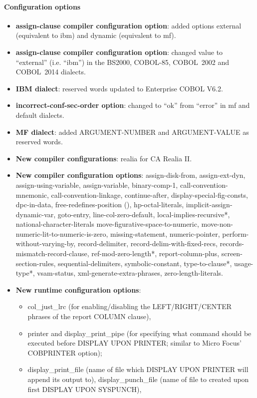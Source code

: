 \paragraph{Configuration options}
\begin{itemize}
\item \textbf{assign-clause compiler configuration option}: added options external (equivalent to ibm) and dynamic (equivalent to mf).
\item \textbf{assign-clause compiler configuration option}: changed value to ``external'' (i.e. ``ibm'') in the BS2000, COBOL-85, COBOL~2002 and COBOL~2014 dialects.
\item \textbf{IBM dialect}: reserved words updated to Enterprise COBOL V6.2.
\item \textbf{incorrect-conf-sec-order option}: changed to ``ok'' from ``error'' in mf and default dialects.
\item \textbf{MF dialect}: added ARGUMENT-NUMBER and ARGUMENT-VALUE as reserved words.
\item \textbf{New compiler configurations}: realia for CA Realia II.
\item \textbf{New compiler configuration options}: assign-disk-from, assign-ext-dyn, assign-using-variable, assign-variable, binary-comp-1, call-convention-mnemonic, call-convention-linkage, continue-after, display-special-fig-consts, dpc-in-data, free-redefines-position (), hp-octal-literals, implicit-assign-dynamic-var, goto-entry, line-col-zero-default, local-implies-recursive*, national-character-literals move-figurative-space-to-numeric, move-non-numeric-lit-to-numeric-is-zero, missing-statement, numeric-pointer, perform-without-varying-by, record-delimiter, record-delim-with-fixed-recs, records-mismatch-record-clause, ref-mod-zero-length*, report-column-plus, screen-section-rules, sequential-delimiters, symbolic-constant, type-to-clause*, usage-type*, vsam-status, xml-generate-extra-phrases, zero-length-literals.
\item \textbf{New runtime configuration options}:
  \begin{itemize}
  \item col\_just\_lrc (for enabling\slash{}disabling the LEFT\slash{}RIGHT\slash{}CENTER phrases of the report COLUMN clause),
  \item printer and display\_print\_pipe (for specifying what command should be executed before DISPLAY UPON PRINTER; similar to Micro Focus' COBPRINTER option);
  \item display\_print\_file (name of file which DISPLAY UPON PRINTER will append its output to), display\_punch\_file (name of file to created upon first DISPLAY UPON SYSPUNCH),

\end{itemize}
\end{itemize}
